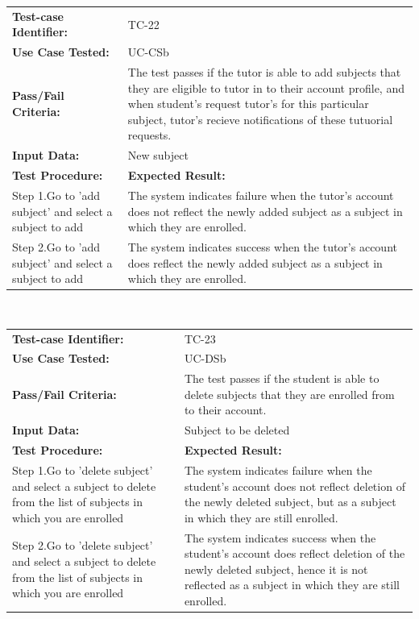 \documentclass[12pt]{article}
\begin{document}
{\begin{tabular}{| p{8cm} | p{8cm} |} \hline
	\textbf{Test-case Identifier:}& TC-22\\
	\textbf{Use Case Tested:}& UC-CSb\\
	\textbf{Pass/Fail Criteria:}& The test passes if the tutor is able to add subjects that they are eligible to tutor in to their account profile, and when student's request tutor's for this particular subject, tutor's recieve notifications of these tutuorial requests.\\
	\textbf{Input Data:}& New subject\\\hline
	\textbf{Test Procedure:}& \textbf{Expected Result:} \\\hline
	Step 1.Go to 'add subject' and select a subject to add& The system indicates failure when the tutor's account does not reflect the newly added subject as a subject in which they are enrolled. \\
	Step 2.Go to 'add subject' and select a subject to add & The system indicates success when the tutor's account does reflect the newly added subject as a subject in which they are enrolled.\\
		\hline
\end{tabular}
\\


\begin{tabular}{| p{8cm} | p{8cm} |} \hline
	\textbf{Test-case Identifier:}& TC-23\\
	\textbf{Use Case Tested:}& UC-DSb\\
	\textbf{Pass/Fail Criteria:}& The test passes if the student is able to delete subjects that they are enrolled from to their account.\\
	\textbf{Input Data:}& Subject to be deleted\\\hline
	\textbf{Test Procedure:}& \textbf{Expected Result:} \\\hline
	Step 1.Go to 'delete subject' and select a subject to delete from the list of subjects in which you are enrolled & The system indicates failure when the student's account does not reflect deletion of the newly deleted subject, but as a subject in which they are still enrolled. \\
	Step 2.Go to 'delete subject' and select a subject to delete from the list of subjects in which you are enrolled & The system indicates success when the student's account does  reflect deletion of the newly deleted subject, hence it is not reflected  as a subject in which they are still enrolled.\\
		\hline
\end{tabular}
\\

}
\end{document}
